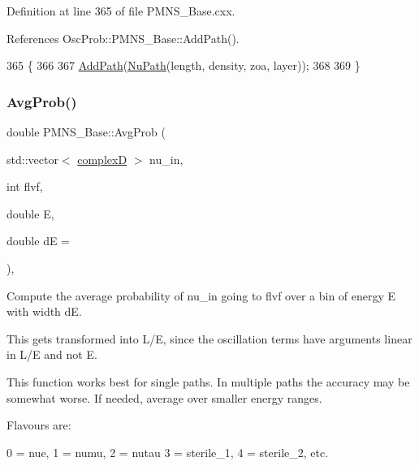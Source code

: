 Definition at line 365 of file P\+M\+N\+S\+\_\+\+Base.\+cxx.



References Osc\+Prob\+::\+P\+M\+N\+S\+\_\+\+Base\+::\+Add\+Path().


\begin{DoxyCode}
365                                                                            \{
366 
367   \hyperlink{classOscProb_1_1PMNS__Base_a887dc9d4dc569ec0cdef3933b4c60efc}{AddPath}(\hyperlink{structOscProb_1_1NuPath}{NuPath}(length, density, zoa, layer));
368 
369 \}
\end{DoxyCode}
\mbox{\label{classOscProb_1_1PMNS__Base_a89e54c80ae8a31effbab7b2b970606bb}} 
\subsubsection{\texorpdfstring{Avg\+Prob()}{AvgProb()}\hspace{0.1cm}{\footnotesize\ttfamily [1/2]}}
{\footnotesize\ttfamily double P\+M\+N\+S\+\_\+\+Base\+::\+Avg\+Prob (\begin{DoxyParamCaption}\item[{std\+::vector$<$ \hyperlink{EigenPoint_8h_a67ca8e107e20610c3fff78d5e726ece0}{complexD} $>$}]{nu\+\_\+in,  }\item[{int}]{flvf,  }\item[{double}]{E,  }\item[{double}]{dE = {} }\end{DoxyParamCaption})\hspace{0.3cm}{\ttfamily [virtual]}, {\ttfamily [inherited]}}

Compute the average probability of nu\+\_\+in going to flvf over a bin of energy E with width dE.

This gets transformed into L/E, since the oscillation terms have arguments linear in L/E and not E.

This function works best for single paths. In multiple paths the accuracy may be somewhat worse. If needed, average over smaller energy ranges.

Flavours are\+: 
\begin{DoxyPre}
  0 = nue, 1 = numu, 2 = nutau
  3 = sterile\_1, 4 = sterile\_2, etc.
\end{DoxyPre}
 
